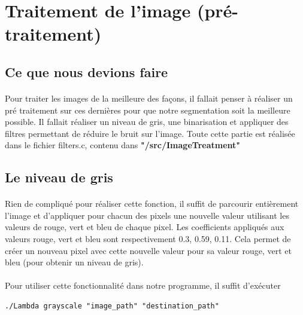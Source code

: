 \documentclass{article}
\begin{document}
\newpage

\section{Traitement de l'image (pré-traitement)}

\subsection{Ce que nous devions faire}

\paragraph{}Pour traiter les images de la meilleure des façons, il fallait penser à réaliser un pré traitement sur ces dernières pour que notre segmentation soit la meilleure possible. Il fallait réaliser un niveau de gris, une binarisation et appliquer des filtres permettant de réduire le bruit sur l'image. Toute cette partie est réalisée dans le fichier filters.c, contenu dans \textbf{"/src/ImageTreatment"}

\subsection{Le niveau de gris}

\paragraph{}Rien de compliqué pour réaliser cette fonction, il suffit de parcourir entièrement l'image et d'appliquer pour chacun des pixels une nouvelle valeur utilisant les valeurs de rouge, vert et bleu de chaque pixel. Les coefficients appliqués aux valeurs rouge, vert et bleu sont respectivement 0.3, 0.59, 0.11. Cela permet de créer un nouveau pixel avec cette nouvelle valeur pour sa valeur rouge, vert et bleu (pour obtenir un niveau de gris).

\paragraph{}Pour utiliser cette fonctionnalité dans notre programme, il suffit d'exécuter
\begin{lstlisting}
./Lambda grayscale "image_path" "destination_path"
\end{lstlisting}
\end{document}
